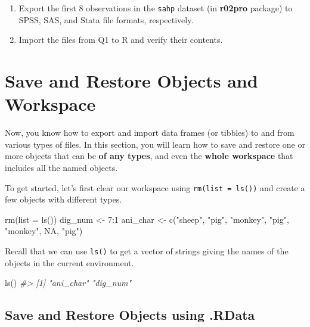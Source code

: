 \documentclass[
]{book}
\newenvironment{Shaded}{\begin{snugshade}}{\end{snugshade}}
\newcommand{\AttributeTok}[1]{\textcolor[rgb]{0.77,0.63,0.00}{#1}}
\newcommand{\CommentTok}[1]{\textcolor[rgb]{0.56,0.35,0.01}{\textit{#1}}}
\newcommand{\ConstantTok}[1]{\textcolor[rgb]{0.00,0.00,0.00}{#1}}
\newcommand{\DecValTok}[1]{\textcolor[rgb]{0.00,0.00,0.81}{#1}}
\newcommand{\FunctionTok}[1]{\textcolor[rgb]{0.00,0.00,0.00}{#1}}
\newcommand{\NormalTok}[1]{#1}
\newcommand{\OtherTok}[1]{\textcolor[rgb]{0.56,0.35,0.01}{#1}}
\newcommand{\SpecialCharTok}[1]{\textcolor[rgb]{0.00,0.00,0.00}{#1}}
\newcommand{\StringTok}[1]{\textcolor[rgb]{0.31,0.60,0.02}{#1}}
\providecommand{\tightlist}{%
  \setlength{\itemsep}{0pt}\setlength{\parskip}{0pt}}
\begin{document}
\begin{enumerate}
\def\labelenumi{\arabic{enumi}.}
\tightlist
\item
  Export the first 8 observations in the \texttt{sahp} dataset (in \textbf{r02pro} package) to SPSS, SAS, and Stata file formats, respectively.
\item
  Import the files from Q1 to R and verify their contents.
\end{enumerate}

\hypertarget{save-object}{%
\section{Save and Restore Objects and Workspace}\label{save-object}}

Now, you know how to export and import data frames (or tibbles) to and from various types of files. In this section, you will learn how to save and restore one or more objects that can be \textbf{of any types}, and even the \textbf{whole workspace} that includes all the named objects.

To get started, let's first clear our workspace using \texttt{rm(list\ =\ ls())} and create a few objects with different types.

\begin{Shaded}
\begin{Highlighting}[]
\FunctionTok{rm}\NormalTok{(}\AttributeTok{list =} \FunctionTok{ls}\NormalTok{())}
\NormalTok{dig\_num }\OtherTok{\textless{}{-}} \DecValTok{7}\SpecialCharTok{:}\DecValTok{1}
\NormalTok{ani\_char }\OtherTok{\textless{}{-}} \FunctionTok{c}\NormalTok{(}\StringTok{"sheep"}\NormalTok{, }\StringTok{"pig"}\NormalTok{, }\StringTok{"monkey"}\NormalTok{, }\StringTok{"pig"}\NormalTok{, }\StringTok{"monkey"}\NormalTok{, }\ConstantTok{NA}\NormalTok{, }\StringTok{"pig"}\NormalTok{)}
\end{Highlighting}
\end{Shaded}

Recall that we can use \texttt{ls()} to get a vector of strings giving the names of the objects in the current environment.

\begin{Shaded}
\begin{Highlighting}[]
\FunctionTok{ls}\NormalTok{()}
\CommentTok{\#\textgreater{} [1] "ani\_char" "dig\_num"}
\end{Highlighting}
\end{Shaded}

\hypertarget{save-and-restore-objects-using-.rdata}{%
\subsection{Save and Restore Objects using .RData}\label{save-and-restore-objects-using-.rdata}}
\end{document}
